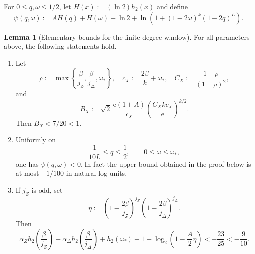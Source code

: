 \documentclass[11pt]{article}
\theoremstyle{definition}
\newtheorem{lemma}[theorem]{Lemma}
\newcommand{\h}{h_2}
\begin{document}
For \(0\le q,\omega\le1/2\), let \(H(x):=(\ln2)\h(x)\) and define
\[
\psi(q,\omega):=
A H(q)+H(\omega)-\ln2
+\ln\!\left(1+(1-2\omega)^k(1-2q)^L\right).
\]

\begin{lemma}[Elementary bounds for the finite degree window]\label{lem:mn-window-bounds-jp}
For all parameters above, the following statements hold.

\begin{enumerate}
\item Let
\[
\rho:=\max\!\left\{\frac\beta{j_Z},\frac\beta{j_\Delta},\omega_*\right\},
\quad c_X:=\frac{2\beta}{k}+\omega_*,
\quad C_X:=\frac{1+\rho}{(1-\rho)^2},
\]
and
\[
B_X:=\sqrt2\,\frac{\mathrm e(1+A)}{c_X}
\left(\frac{C_Xkc_X}{\mathrm e}\right)^{k/2}.
\]
Then \(B_X<7/20<1\).

\item Uniformly on
\[
\frac1{10L}\le q\le\frac12,\qquad 0\le\omega\le\omega_*,
\]
one has \(\psi(q,\omega)<0\).  In fact the upper bound obtained in the
proof below is at most \(-1/100\) in natural-log units.

\item If \(j_Z\) is odd, set
\[
\eta:=
\left(1-\frac{2\beta}{j_Z}\right)^{j_Z}
\left(1-\frac{2\beta}{j_\Delta}\right)^{j_\Delta}.
\]
Then
\[
\alpha_Z\h\!\left(\frac\beta{j_Z}\right)
+\alpha_\Delta\h\!\left(\frac\beta{j_\Delta}\right)
+\h(\omega_*)-1+\log_2\!\left(1-\frac A2\eta\right)<-\frac{23}{25}< -\frac9{10}.
\]
\end{enumerate}
\end{lemma}
\end{document}
